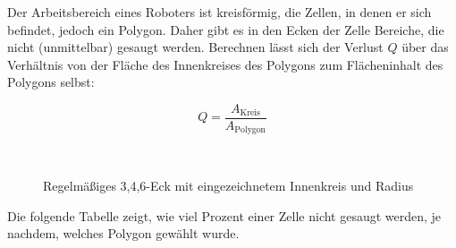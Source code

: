 \documentclass{article}
\begin{document}
Der Arbeitsbereich eines Roboters ist kreisförmig, die Zellen, in denen er
sich befindet, jedoch ein Polygon. Daher gibt es in den Ecken der Zelle 
Bereiche, die nicht (unmittelbar) gesaugt werden. Berechnen lässt 
sich der Verlust $Q$ über das Verhältnis von der Fläche des Innenkreises 
des Polygons zum Flächeninhalt des Polygons selbst:

\begin{equation}
  Q = \frac{A_\text{Kreis} }{A_\text{Polygon}}
\end{equation}

\begin{figure}[!ht]
  \centering
  \qquad
  \qquad
  \\
  \caption{Regelmäßiges 3,4,6-Eck mit eingezeichnetem Innenkreis und Radius}
  \label{fig:floor_quotient_circle_polygon}
\end{figure}

Die folgende Tabelle zeigt, wie viel Prozent einer Zelle nicht gesaugt werden,
je nachdem, welches Polygon gewählt wurde.
\end{document}
